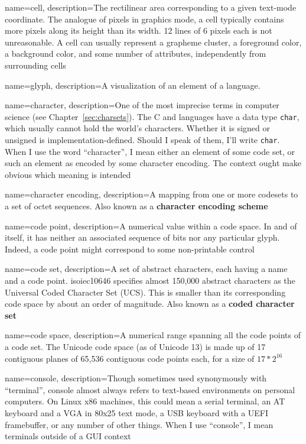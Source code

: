 {
  name={cell},
description={The rectilinear area corresponding to a given text-mode coordinate.
  The analogue of pixels in graphics mode, a cell typically contains more
  pixels along its height than its width. 12 lines of 6 pixels each is not
  unreasonable. A cell can usually represent a grapheme cluster, a foreground
  color, a background color, and some number of attributes, independently
  from surrounding cells}
}

{
  name={glyph},
  description={A visualization of an element of a language.}
}

{
  name={character},
description={One of the most imprecise terms in computer science (see Chapter~\ref{sec:charsets}).
  The C and \CC languages have a data type \texttt{char}, which usually cannot hold the
  world's characters. Whether it is signed or unsigned is implementation-defined.
  Should I speak of them, I'll write \texttt{char}. When I use the word
  ``character'', I mean either an element of some code set, or such an element
  as encoded by some character encoding. The context ought make obvious which
  meaning is intended}
}

{
  name={character encoding},
  description={A mapping from one or more \glspl{codeset} to a set of octet
  sequences. Also known as a \textbf{character encoding scheme}\cite{rfc2978}}
}

{
  name={code point},
description={A numerical value within a code space. In and of itself,
  it has neither an associated sequence of bits nor any particular glyph.
  Indeed, a code point might correspond to some non-printable control}
}

{
  name={code set},
description={A set of abstract characters, each having a name and a code
  point. \Gls{isoiec10646} specifies almost 150,000 abstract characters as the
  Universal Coded Character Set (UCS). This is smaller than its corresponding
  code space by about an order of magnitude. Also known as a
  \textbf{coded character set}\cite{rfc2978}}
}

{
  name={code space},
description={A numerical range spanning all the code points of a code set.
  The Unicode code space (as of Unicode 13) is made up of 17 contiguous
  planes of 65,536 contiguous code points each, for a size of $17*2^{16}$}
}

{
  name={console},
description={Though sometimes used synonymously with ``terminal'', console almost
  always refers to text-based environments on personal computers. On Linux
  x86 machines, this could mean a serial terminal, an AT keyboard and a VGA
  in 80x25 text mode, a USB keyboard with a UEFI framebuffer, or any number
  of other things. When I use ``console'', I mean terminals outside of a GUI
  context}
}


